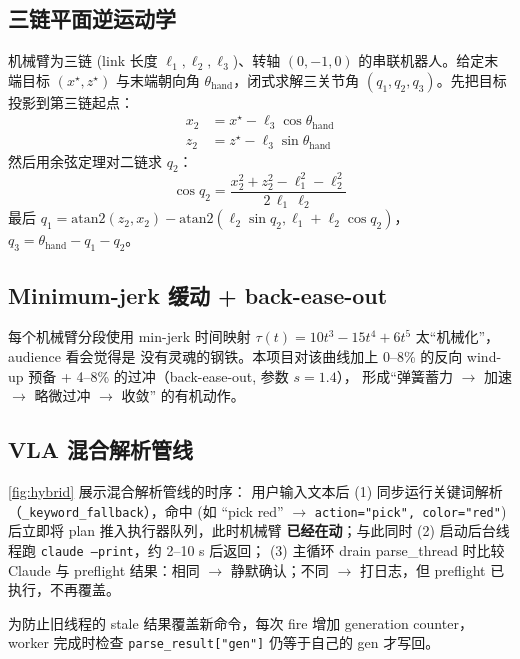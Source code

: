 \documentclass[12pt, a4paper, UTF8]{ctexart}
\begin{document}
\subsection{三链平面逆运动学}
机械臂为三链 (link 长度 $\ell_1, \ell_2, \ell_3$)、转轴
$(0, -1, 0)$ 的串联机器人。给定末端目标 $(x^\star, z^\star)$
与末端朝向角 $\theta_{\text{hand}}$，闭式求解三关节角
$(q_1, q_2, q_3)$。先把目标投影到第三链起点：
\begin{align}
x_2 &= x^\star - \ell_3 \cos\theta_{\text{hand}} \\
z_2 &= z^\star - \ell_3 \sin\theta_{\text{hand}}
\end{align}
然后用余弦定理对二链求 $q_2$：
\[ \cos q_2 = \frac{x_2^2 + z_2^2 - \ell_1^2 - \ell_2^2}
                  {2\,\ell_1\,\ell_2} \]
最后 $q_1 = \mathrm{atan2}(z_2, x_2) - \mathrm{atan2}
(\ell_2 \sin q_2, \ell_1 + \ell_2 \cos q_2)$，
$q_3 = \theta_{\text{hand}} - q_1 - q_2$。

\subsection{Minimum-jerk 缓动 + back-ease-out}
每个机械臂分段使用 min-jerk 时间映射 $\tau(t) =
10t^3 - 15t^4 + 6t^5$ 太``机械化''，audience 看会觉得是
没有灵魂的钢铁。本项目对该曲线加上 0--8\% 的反向 wind-up
预备 + 4--8\% 的过冲（back-ease-out, 参数 $s = 1.4$），
形成``弹簧蓄力 $\to$ 加速 $\to$ 略微过冲 $\to$ 收敛''
的有机动作。

\subsection{VLA 混合解析管线}\label{ssec:hybrid}
\autoref{fig:hybrid} 展示混合解析管线的时序：
用户输入文本后 (1) 同步运行关键词解析
（\texttt{\_keyword\_fallback}），命中 (如 ``pick red'' $\to$ \texttt{action="pick",
color="red"}) 后立即将 plan 推入执行器队列，此时机械臂
\textbf{已经在动}；与此同时 (2) 启动后台线程跑
\texttt{claude --print}，约 2--10 s 后返回；
(3) 主循环 drain parse\_thread 时比较 Claude 与 preflight
结果：相同 $\to$ 静默确认；不同 $\to$ 打日志，但
preflight 已执行，不再覆盖。

为防止旧线程的 stale 结果覆盖新命令，每次 fire 增加
generation counter，worker 完成时检查 \texttt{parse\_result["gen"]}
仍等于自己的 gen 才写回。
\end{document}
